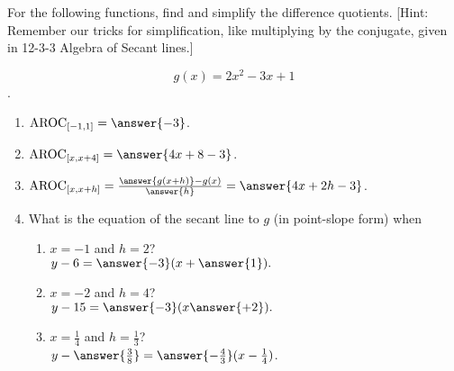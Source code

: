 \documentclass{ximera}
\author{Elizabeth Campolongo}
\begin{document}
\begin{exercise}

For the following functions, 
find and simplify the difference quotients. [Hint: Remember our tricks for simplification, like multiplying by the conjugate, given in 12-3-3 Algebra of Secant lines.]

$$g(x)= 2x^2 -3x+1$$.

\begin{enumerate}

\item $\av_{[-1,1]} = \answer{-3}$.

\item $\av_{[x,x+4]} =  \answer{4x+8-3}$.

\item $\av_{[x,x+h]} = \frac{\answer{g(x+h)}-g(x)}{\answer{h}}  = \answer{4x + 2h - 3}$.  

\item What is the equation of the secant line to $g$ (in point-slope form) when 
\begin{enumerate}
\item $x=-1$ and $h = 2$? \\
$y-6= \answer{-3}(x +\answer{1}).$

\item $x=-2$ and $h = 4$? \\
$y - 15 = \answer{-3}(x \answer{+2}).$

\item $x=\frac{1}{4}$ and $h = \frac{1}{3}$?\\
$y -\answer{\frac{3}{8}} = \answer{-\frac{4}{3}}(x-\frac{1}{4})$.
\end{enumerate}


\end{enumerate}
\end{exercise}
\end{document}
